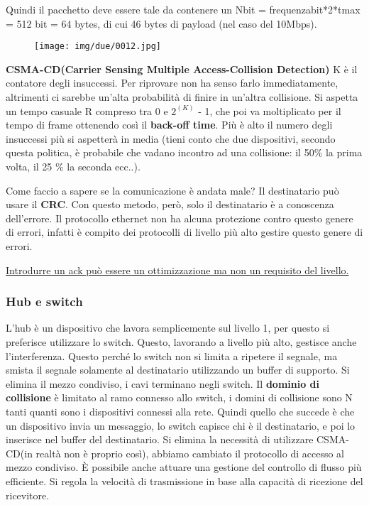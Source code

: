 \documentclass{article}
\begin{document}
\noindent Quindi il pacchetto deve essere tale da contenere
 un Nbit = frequenzabit*2*tmax = 512 bit = 64  bytes, di cui 46 bytes di payload (nel caso del 10Mbps).

 \begin{figure}[!ht]
    \begin{center}
        \texttt{[image: img/due/0012.jpg]}         
    \end{center}
\end{figure}

\noindent \textbf{CSMA-CD(Carrier Sensing Multiple Access-Collision Detection)}
K è il contatore degli insuccessi. Per riprovare non ha senso farlo immediatamente, altrimenti ci sarebbe un'alta probabilità di finire
in un'altra collisione. Si aspetta un tempo casuale R compreso tra 0 e $2^(K)$ - 1, che poi va moltiplicato per il tempo di frame
 ottenendo così il \textbf{back-off time}. Più è alto il numero degli insuccessi più si aspetterà in media
(tieni conto che due dispositivi, secondo questa politica, è probabile che vadano incontro ad una collisione: il 50\% 
 la prima volta, il 25 \% la seconda ecc..).

\noindent Come faccio a sapere se la comunicazione è andata male? Il destinatario può usare il \textbf{CRC}. 
Con questo metodo, però, solo il destinatario è a conoscenza dell'errore. Il protocollo ethernet non ha alcuna protezione 
contro questo genere di errori, infatti è compito dei protocolli di livello più alto gestire questo genere di errori.

\noindent \underline{Introdurre un ack può essere un ottimizzazione ma non un requisito del livello.}

\subsubsection{Hub e switch}
\noindent L'hub è un dispositivo che lavora semplicemente sul livello 1, per questo si preferisce utilizzare lo switch. Questo,
lavorando a livello più alto, gestisce anche l'interferenza. Questo perché lo switch non si limita a ripetere il segnale, ma smista
 il segnale solamente al destinatario utilizzando un buffer di supporto. Si elimina il mezzo condiviso, i cavi terminano negli switch. 
 Il \textbf{dominio di collisione} è limitato al ramo connesso allo switch, i domini di collisione sono N tanti quanti sono i 
 dispositivi connessi alla rete.
 Quindi quello che succede è che un dispositivo invia un messaggio, lo switch capisce chi è il destinatario, e poi lo inserisce nel
  buffer del destinatario. Si elimina la necessità di utilizzare CSMA-CD(in realtà non è proprio così), abbiamo cambiato il protocollo di accesso al mezzo condiviso. 
  È possibile anche attuare una gestione del controllo di flusso più efficiente. Si regola la velocità di 
  trasmissione in base alla capacità di ricezione del ricevitore.
  
\end{document}
